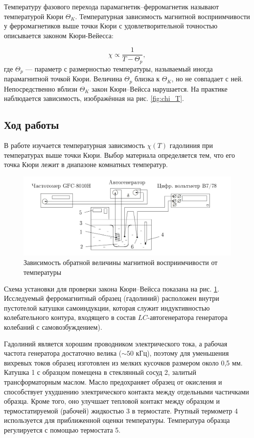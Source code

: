 \documentclass[12pt,a4paper]{article}
\begin{document}
Температуру фазового перехода парамагнетик–ферромагнетик называют температурой Кюри $\Theta_K$. Температурная зависимость магнитной восприимчивости у ферромагнетиков выше точки Кюри с удовлетворительной
точностью описывается законом Кюри-Вейесса:

$$\chi \propto \frac{1}{T - \Theta_p},$$
где $\Theta_p$ — параметр с размерностью температуры, называемый иногда парамагнитной точкой Кюри. Величина $\Theta_p$ близка к $\Theta_K$, но не совпадает
с ней. Непосредственно вблизи $\Theta_K$ закон Кюри–Вейсса нарушается. На
практике наблюдается зависимость, изображённая на рис. \ref{fig:chi_T}.
	
\subsection*{Ход работы}

В работе изучается температурная зависимость $\chi(T)$ гадолиния при
температурах выше точки Кюри. Выбор материала определяется тем,
что его точка Кюри лежит в диапазоне комнатных температур.

\begin{figure}[H]
	\centering
	\includegraphics[width=1.1\linewidth]{"res/fig-scheme.jpg"}
	\caption{Зависимость обратной величины магнитной восприимчивости от температуры}
	\label{fig:scheme}
\end{figure}

Схема установки для проверки закона Кюри–Вейсса показана на
рис. \ref{fig:scheme}. Исследуемый ферромагнитный образец (гадолиний) расположен
внутри пустотелой катушки самоиндукции, которая служит индуктивностью колебательного контура, входящего в состав $LC$-автогенератора генератора колебаний с самовозбуждением).

Гадолиний является хорошим проводником электрического тока, а
рабочая частота генератора достаточно велика ($\sim 50$ кГц), поэтому для
уменьшения вихревых токов образец изготовлен из мелких кусочков размером около 0,5 мм. Катушка 1 с образцом помещена в стеклянный сосуд 2, залитый трансформаторным маслом. Масло предохраняет образец
от окисления и способствует ухудшению электрического контакта между отдельными частичками образца. Кроме того, оно улучшает тепловой
контакт между образцом и термостатируемой (рабочей) жидкостью 3 в
термостате. Ртутный термометр 4 используется для приближенной оценки температуры. Температура образца регулируется с помощью термостата 5.
\end{document}
